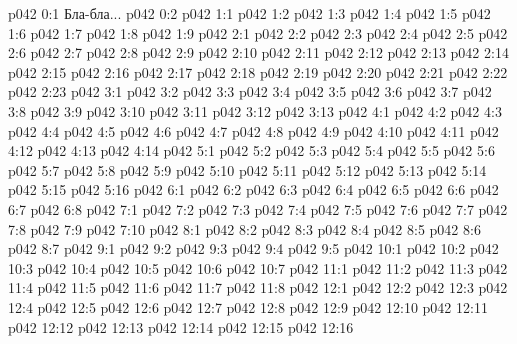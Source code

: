 \author{Могущественный Посланник}
\vs p042 0:1  Бла-бла...
\vs p042 0:2 
\vs p042 1:1 
\vs p042 1:2 
\vs p042 1:3 \pc 
\vs p042 1:4 
\vs p042 1:5 \pc 
\vs p042 1:6 \pc 
\vs p042 1:7 
\vs p042 1:8 
\vs p042 1:9 \pc 
{}
\vs p042 2:1 
\vs p042 2:2 
\vs p042 2:3 
\vs p042 2:4 
\vs p042 2:5 
\vs p042 2:6 
\vs p042 2:7 
\vs p042 2:8 
\vs p042 2:9 
\vs p042 2:10 
\vs p042 2:11 
\vs p042 2:12 
\vs p042 2:13 \pc 
\vs p042 2:14 
\vs p042 2:15 
\vs p042 2:16 
\vs p042 2:17 
\vs p042 2:18 
\vs p042 2:19 
\vs p042 2:20 
\vs p042 2:21 \pc 
\vs p042 2:22 
\vs p042 2:23 \pc 
{}
\vs p042 3:1 
\vs p042 3:2 
\vs p042 3:3 
\vs p042 3:4 
\vs p042 3:5 
\vs p042 3:6 
\vs p042 3:7 
\vs p042 3:8 
\vs p042 3:9 
\vs p042 3:10 
\vs p042 3:11 
\vs p042 3:12 
\vs p042 3:13 \pc 
{}
\vs p042 4:1 
\vs p042 4:2 
\vs p042 4:3 
\vs p042 4:4 
\vs p042 4:5 
\vs p042 4:6 
\vs p042 4:7 
\vs p042 4:8 
\vs p042 4:9 
\vs p042 4:10 
\vs p042 4:11 
\vs p042 4:12 \pc 
\vs p042 4:13 \pc 
\vs p042 4:14 
\vs p042 5:1 
\vs p042 5:2 \pc 
\vs p042 5:3 
\vs p042 5:4 
\vs p042 5:5 
\vs p042 5:6 
\vs p042 5:7 
\vs p042 5:8 
\vs p042 5:9 
\vs p042 5:10 
\vs p042 5:11 
\vs p042 5:12 
\vs p042 5:13 \pc 
\vs p042 5:14 \pc 
\vs p042 5:15 
\vs p042 5:16 
\vs p042 6:1 
\vs p042 6:2 
\vs p042 6:3 \pc 
\vs p042 6:4 \pc 
\vs p042 6:5 
\vs p042 6:6 
\vs p042 6:7 \pc 
\vs p042 6:8 \pc 
{}
\vs p042 7:1 
\vs p042 7:2 \pc 
\vs p042 7:3 
\vs p042 7:4 \pc 
\vs p042 7:5 
\vs p042 7:6 
\vs p042 7:7 \pc 
\vs p042 7:8 \pc 
\vs p042 7:9 
\vs p042 7:10 
\vs p042 8:1 
\vs p042 8:2 
\vs p042 8:3 \pc 
\vs p042 8:4 
\vs p042 8:5 
\vs p042 8:6 
\vs p042 8:7 
\vs p042 9:1 
\vs p042 9:2 
\vs p042 9:3 
\vs p042 9:4 
\vs p042 9:5 
\vs p042 10:1 
\vs p042 10:2 
\vs p042 10:3 
\vs p042 10:4 
\vs p042 10:5 
\vs p042 10:6 \pc 
\vs p042 10:7 
\vs p042 11:1 
\vs p042 11:2 \pc 
\vs p042 11:3 
\vs p042 11:4 \pc 
\vs p042 11:5 
\vs p042 11:6 \pc 
\vs p042 11:7 
\vs p042 11:8 
\vs p042 12:1 
\vs p042 12:2 
\vs p042 12:3 
\vs p042 12:4 
\vs p042 12:5 
\vs p042 12:6 
\vs p042 12:7 
\vs p042 12:8 
\vs p042 12:9 \pc 
\vs p042 12:10 
\vs p042 12:11 
\vs p042 12:12 \pc 
\vs p042 12:13 \pc 
\vs p042 12:14 
\vs p042 12:15 
\vsetoff
\vs p042 12:16 
\quizlink
